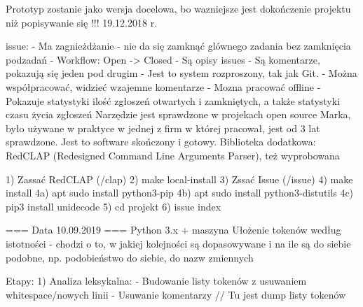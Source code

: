 Prototyp zostanie jako wersja docelowa, bo wazniejsze jest dokończenie projektu niż popisywanie się !!! 19.12.2018 r.

issue:
- Ma zagnieżdżanie - nie da się zamknąć glównego zadania bez zamknięcia podzadań
- Workflow: Open -> Closed
- Są opisy issues
- Są komentarze, pokazują się jeden pod drugim
- Jest to system rozproszony, tak jak Git.
- Można współpracować, widzieć wzajemne komentarze
- Mozna pracować offline
- Pokazuje statystyki ilość zgłoszeń otwartych i zamkniętych, a także statystyki czasu życia zgłoszeń
Narzędzie jest sprawdzone w projekach open source Marka, było używane w praktyce w jednej z firm w której pracował, jest od 3 lat sprawdzone. Jest to software skończony i gotowy.
Biblioteka dodatkowa: RedCLAP (Redesigned Command Line Arguments Parser), też wyprobowana

1) Zassać RedCLAP (/clap)
2) make local-install
3) Zssać Issue (/issue)
4) make install
4a) apt sudo install python3-pip
4b) apt sudo install python3-distutils
4c) pip3 install unidecode
5) cd projekt
6) issue index

=== Data 10.09.2019 ===
Python 3.x + maszyna
Ułożenie tokenów według istotności - chodzi o to, w jakiej kolejności są dopasowywane i na ile są do siebie podobne, np. podobieństwo do siebie, do nazw zmiennych

Etapy:
1) Analiza leksykalna:
  - Budowanie listy tokenów z usuwaniem whitespace/nowych linii
  - Usuwanie komentarzy
  // Tu jest dump listy tokenów
  
